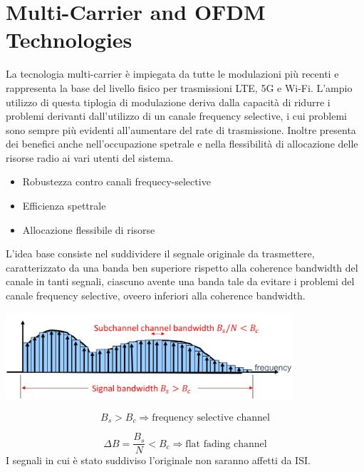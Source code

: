 \section*{Multi-Carrier and OFDM Technologies}






La tecnologia multi-carrier è impiegata da tutte le modulazioni più recenti e rappresenta la base del livello fisico per trasmissioni LTE, 5G e Wi-Fi. 
L'ampio utilizzo di questa tiplogia di modulazione deriva dalla capacità di ridurre i problemi derivanti dall'utilizzo di un canale frequency selective, i cui problemi sono sempre più evidenti all'aumentare del rate di trasmissione. Inoltre presenta dei benefici anche nell'occupazione spetrale e nella flessibilità di allocazione delle risorse radio ai vari utenti del sistema.
\begin{itemize}
    \item Robustezza contro canali frequecy-selective
    \item Efficienza spettrale
    \item Allocazione flessibile di risorse
\end{itemize}

L'idea base consiste nel suddividere il segnale originale da trasmettere, caratterizzato da una banda ben superiore rispetto alla coherence bandwidth del canale in tanti segnali, ciascuno avente una banda tale da evitare i problemi del canale frequency selective, oveero inferiori alla coherence bandwidth.





\begin{center}
    \includegraphics[width=0.8\textwidth]{imgs/multicarrier.jpg}
\end{center}
 



\[
  B_s > B_c \Rightarrow \text{frequency selective channel}  
\]

\[
    \Delta B = \frac{B_s}{N} < B_c \Rightarrow \text{flat fading channel}
\]
I segnali in cui è stato suddiviso l'originale non saranno affetti da ISI.

